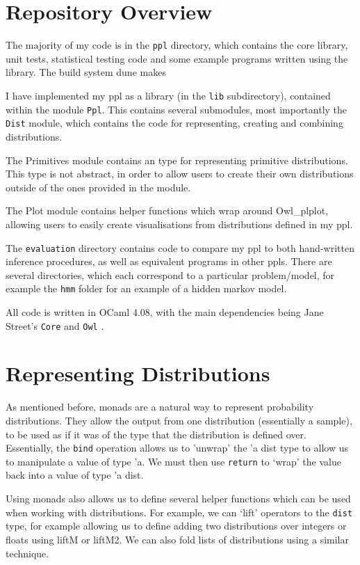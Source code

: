 \section{Repository Overview}

The majority of my code is in the \texttt{ppl} directory, which contains the core library, unit tests, statistical testing code and some example programs written using the library. The build system dune makes 


I have implemented my ppl as a library (in the \texttt{lib} subdirectory), contained within the module \texttt{Ppl}. This contains several submodules, most importantly the \texttt{Dist} module, which contains the code for representing, creating and combining distributions. 

The Primitives module contains an type for representing primitive distributions. This type is not abstract, in order to allow users to create their own distributions outside of the ones provided in the module.

The Plot module contains helper functions which wrap around Owl\_plplot, allowing users to easily create visualisations from distributions defined in my ppl.

The \texttt{evaluation} directory contains code to compare my ppl to both hand-written inference procedures, as well as equivalent programs in other ppls. There are several directories, which each correspond to a particular problem/model, for example the \texttt{hmm} folder for an example of a hidden markov model.

All code is written in OCaml 4.08, with the main dependencies being Jane Street's \texttt{Core} and \texttt{Owl} \cite{owl}.

\section{Representing Distributions}

As mentioned before, monads are a natural way to represent probability distributions. They allow the output from one distribution (essentially a sample), to be used as if it was of the type that the distribution is defined over. Essentially, the \texttt{bind} operation allows us to 'unwrap' the 'a dist type to allow us to manipulate a value of type 'a. We must then use \texttt{return} to `wrap' the value back into a value of type 'a dist.

Using monads also allows us to define several helper functions which can be used when working with distributions. For example, we can `lift' operators to the \texttt{dist} type, for example allowing us to define adding two distributions over integers or floats using liftM or liftM2. We can also fold lists of distributions using a similar technique.

